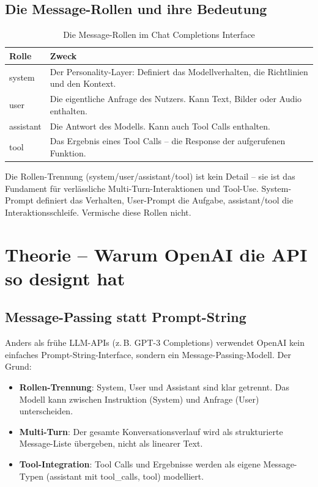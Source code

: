 \subsection*{Die Message-Rollen und ihre Bedeutung}

\begin{table}[H]
\centering
\begin{tabularx}{\linewidth}{lX}
\toprule
\textbf{Rolle} & \textbf{Zweck} \\
\midrule
system & Der Personality-Layer: Definiert das Modellverhalten, die Richtlinien und den Kontext. \\
user & Die eigentliche Anfrage des Nutzers. Kann Text, Bilder oder Audio enthalten. \\
assistant & Die Antwort des Modells. Kann auch Tool Calls enthalten. \\
tool & Das Ergebnis eines Tool Calls -- die Response der aufgerufenen Funktion. \\
\bottomrule
\end{tabularx}
\caption{Die Message-Rollen im Chat Completions Interface}
\label{tab:message-roles}
\end{table}

\begin{praxishinweis}
Die Rollen-Trennung (system/user/assistant/tool) ist kein Detail -- sie ist das Fundament für verlässliche Multi-Turn-Interaktionen und Tool-Use. System-Prompt definiert das Verhalten, User-Prompt die Aufgabe, assistant/tool die Interaktionsschleife. Vermische diese Rollen nicht.
\end{praxishinweis}

\section{Theorie -- Warum OpenAI die API so designt hat}

\subsection{Message-Passing statt Prompt-String}

Anders als frühe LLM-APIs (z.\,B. GPT-3 Completions) verwendet OpenAI kein einfaches Prompt-String-Interface, sondern ein Message-Passing-Modell. Der Grund:

\begin{itemize}[leftmargin=*]
    \item \textbf{Rollen-Trennung}: System, User und Assistant sind klar getrennt. Das Modell kann zwischen Instruktion (System) und Anfrage (User) unterscheiden.
    \item \textbf{Multi-Turn}: Der gesamte Konversationsverlauf wird als strukturierte Message-Liste übergeben, nicht als linearer Text.
    \item \textbf{Tool-Integration}: Tool Calls und Ergebnisse werden als eigene Message-Typen (assistant mit tool\_calls, tool) modelliert.
\end{itemize}


